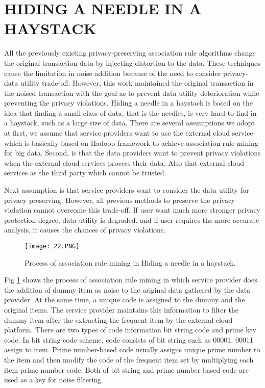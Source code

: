 \documentclass[10pt,a4paper,journal]{IEEEtran}
\begin{document}
\section{HIDING A NEEDLE IN A HAYSTACK}
\hspace{2em} All the previously existing privacy-preserving association rule algorithms change the original transaction data by injecting distortion to the data. These techniques cause the limitation in noise addition because of the need to consider privacy-data utility trade-off. However, this work maintained the original transaction in the noised transaction with the goal as to prevent data utility deterioration while preventing the privacy violations. Hiding a needle in a haystack\cite{1} is based on the idea that finding a small class of data, that is the needles, is  very hard to find in a haystack, such as a large size of data.
 There are several assumptions we adopt at first, we assume that service providers want to use the external cloud service which is basically based on Hadoop framework to achieve association rule mining for big data. Second, is that the data providers want to prevent privacy violations when the external cloud services process their data. Also that external cloud services as the third party which cannot be trusted\cite{11}.

\hspace{2em}Next assumption is that service providers want to consider the data utility for privacy preserving. However, all previous methods to preserve the privacy violation cannot overcome this  trade-off. If user want much more stronger privacy protection degree, data utility is degraded, and if user requires the more accurate analysis, it causes the chances of privacy violations.
\begin{figure}[hbtp]
\texttt{[image: 22.PNG]}
\caption{Process of association rule mining in Hiding a needle in a haystack\cite{1}.}
\label{Figure 2:}
\end{figure}


\hspace{2em}Fig \ref{Figure 2:} shows the process of association rule mining in which service provider does the addition of dummy item as noise to the original data gathered by the data provider. At the same time, a unique code is assigned to the dummy and the original items. The service provider maintains this information to filter the dummy item after the extracting the frequent item by the external cloud platform. There are two types of code information bit string code and prime key code. In bit string code scheme, code consists of bit string such as 00001, 00011 assign to item. Prime number-based code usually assigns unique prime number to the item and then modify the code of the frequent item set by multiplying each item prime number code. Both of bit string and prime number-based code are used as a key for noise filtering. 
\end{document}
